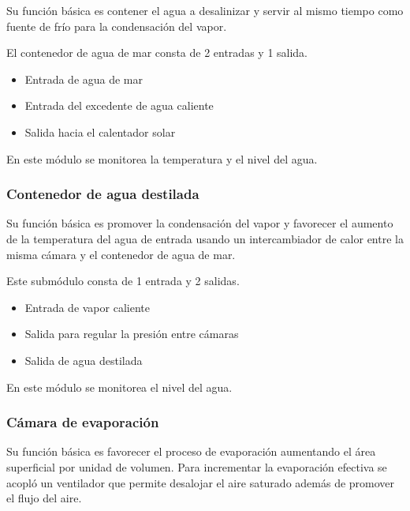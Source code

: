 				Su función básica es contener el agua a desalinizar y servir al mismo tiempo como fuente de frío para la condensación del vapor.
				
				El contenedor de agua de mar consta de 2 entradas y 1 salida.
				\begin{itemize}[columns=2]
					\item Entrada de agua de mar
					\item Entrada del excedente de agua caliente
					\item Salida hacia el calentador solar
				\end{itemize}
				
				\begin{center}
					En este módulo se monitorea la temperatura y el nivel del agua.
				\end{center}			
			
			\subsubsection{Contenedor de agua destilada}
				
				Su función básica es promover la condensación del vapor y favorecer el aumento de la temperatura del agua de entrada usando un intercambiador de calor entre la misma cámara y el contenedor de agua de mar.
				
				Este submódulo consta de 1 entrada y 2 salidas.
				
				\begin{itemize}[columns=2]
					\item Entrada de vapor caliente \columnbreak
					\item Salida para regular la presión entre cámaras
					\item Salida de agua destilada
				\end{itemize}
				
				\begin{center}
					En este módulo se monitorea el nivel del agua.
				\end{center}
							
			\subsubsection{Cámara de evaporación}
				
				Su función básica es favorecer el proceso de evaporación aumentando el área superficial por unidad de volumen. Para incrementar la evaporación efectiva se acopló un ventilador que permite desalojar el aire saturado además de promover el flujo del aire.
				
